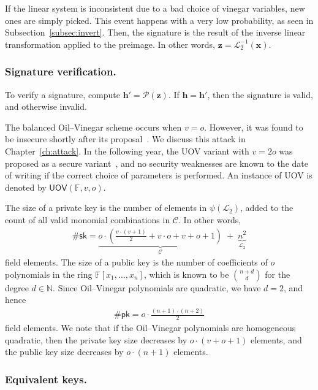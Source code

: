 \documentclass[12pt, a4paper, oneside]{memoir}
\theoremstyle{definition}
\begin{document}
If the linear system is inconsistent due to a bad choice of vinegar variables, new ones are simply picked. This event happens with a very low probability, as seen in Subsection~\ref{subsec:invert}. Then, the signature is the result of the inverse linear transformation applied to the preimage. In other words, $\mathbf{z} = \mathcal{L}_{2}^{-1}(\mathbf{x})$.

\subsubsection{Signature verification.}

To verify a signature, compute $\mathbf{h'} = \mathcal{P}(\mathbf{z})$. If $\mathbf{h} = \mathbf{h'}$, then the signature is valid, and otherwise invalid.

The balanced Oil--Vinegar scheme occurs when $v = o$. However, it was found to be insecure shortly after its proposal~\cite{Kipnis:199808}. We discuss this attack in Chapter~\ref{ch:attack}. In the following year, the UOV variant with $v = 2o$ was proposed as a secure variant~\cite{Kipnis:199904}, and no security weaknesses are known to the date of writing if the correct choice of parameters is performed. An instance of UOV is denoted by $\mathsf{UOV}(\mathbb{F}, v, o)$.

The size of a private key is the number of elements in $\psi(\mathcal{L}_{2})$, added to the count of all valid monomial combinations in $\mathcal{C}$. In other words,
\begin{align}
  \#\mathsf{sk} = \underbrace{o \cdot \left( \frac{v \cdot (v + 1)}{2} + v \cdot o + v + o + 1 \right)}_{\mathcal{C}} \;
    + \; \underbrace{n^{2}}_{\mathcal{L}_{2}}
\end{align}
field elements. The size of a public key is the number of coefficients of $o$ polynomials in the ring $\mathbb{F}[x_{1}, \dots, x_{n}]$, which is known to be $\binom{n + d}{d}$ for the degree $d \in \mathbb{N}$. Since Oil--Vinegar polynomials are quadratic, we have $d = 2$, and hence
\begin{align}
  \#\mathsf{pk} = o \cdot \frac{(n + 1) \cdot (n + 2)}{2}
\end{align}
field elements. We note that if the Oil--Vinegar polynomials are homogeneous quadratic, then the private key size decreases by $o \cdot (v + o + 1)$ elements, and the public key size decreases by $o \cdot (n + 1)$ elements.

\subsubsection{Equivalent keys.}
\end{document}
